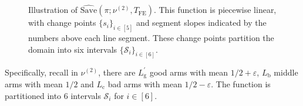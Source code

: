 \documentclass[twoside,11pt]{article}
\newcommand{\rmb}{\mathrm{b}}
\newcommand{\rmc}{\mathrm{c}}
\newcommand{\rmg}{\mathrm{g}}
\newcommand{\Tfe}{T_{\mathrm{FE}}}
\begin{document}
\begin{figure}[t]
\begin{center}








        \caption{Illustration of $\widehat{\mathrm{Save}}(\pi;\nu^{(2)},\Tfe)$. 
        This function is piecewise linear, with change points 
        \textcolor{acadGreen}{$\{s_i\}_{i\in[5]}$} 
        and segment slopes indicated by the \textcolor{acadBlue}{numbers above each line segment}. 
        These change points partition the domain into six intervals 
        \textcolor{acadPurple}{$\{\mathcal{S}_i\}_{i\in[6]}$}.
        }
        \label{fig:savedstar_ins2}
    \end{center}
\end{figure}
Specifically, recall in $\nu^{(2)}$, there are $L_{\rmg}^\prime$ good arms with mean $1/2+\varepsilon$, $L_{\rmb}$ middle arms with mean $1/2$ and $L_{\rmc}$ bad arms with mean $1/2-\varepsilon$. The function is partitioned into $6$ intervals $\mathcal{S}_i$ for $i\in[6]$.
\end{document}
